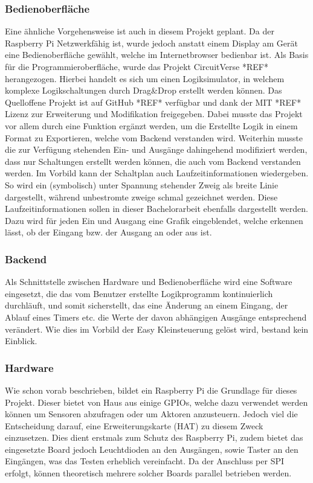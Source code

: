\subsubsection{Bedienoberfläche} \label{kap:grundl:bedienoberfl}
Eine ähnliche Vorgehensweise ist auch in diesem Projekt geplant. Da der Raspberry Pi Netzwerkfähig ist, wurde jedoch anstatt einem Display am Gerät eine Bedienoberfläche gewählt, welche im Internetbrowser bedienbar ist. Als Basis für die Programmieroberfläche, wurde das Projekt CircuitVerse *REF* herangezogen. Hierbei handelt es sich um einen Logiksimulator, in welchem komplexe Logikschaltungen durch Drag\&Drop erstellt werden können. Das Quelloffene Projekt ist auf GitHub *REF* verfügbar und dank  der MIT *REF* Lizenz zur Erweiterung und Modifikation freigegeben. Dabei musste das Projekt vor allem durch eine Funktion ergänzt werden, um die Erstellte Logik in einem Format zu Exportieren, welche vom Backend verstanden wird. Weiterhin musste die zur Verfügung stehenden Ein- und Ausgänge dahingehend modifiziert werden, dass nur Schaltungen erstellt werden können, die auch vom Backend verstanden werden. 
Im Vorbild kann der Schaltplan auch Laufzeitinformationen wiedergeben. So wird ein (symbolisch) unter Spannung stehender Zweig als breite Linie dargestellt, während unbestromte zweige schmal gezeichnet werden. Diese Laufzeitinformationen sollen in dieser Bachelorarbeit ebenfalls dargestellt werden. Dazu wird für jeden Ein und Ausgang eine Grafik eingeblendet, welche erkennen lässt, ob der Eingang bzw. der Ausgang an oder aus ist.
\subsubsection{Backend} 
Als Schnittstelle zwischen Hardware und Bedienoberfläche wird eine Software eingesetzt, die das vom Benutzer erstellte Logikprogramm kontinuierlich durchläuft, und somit sicherstellt, das eine Änderung an einem Eingang, der Ablauf eines Timers etc. die Werte der davon abhängigen Ausgänge entsprechend verändert. Wie dies im Vorbild der Easy Kleinsteuerung gelöst wird, bestand kein Einblick.  

\subsubsection{Hardware} 
Wie schon vorab beschrieben, bildet ein Raspberry Pi die Grundlage für dieses Projekt. Dieser bietet von Haus aus einige GPIOs, welche  dazu  verwendet werden können um Sensoren abzufragen oder um Aktoren anzusteuern. Jedoch viel die Entscheidung darauf, eine Erweiterungskarte (HAT) zu diesem Zweck einzusetzen. Dies dient erstmals zum Schutz des Raspberry Pi, zudem bietet das eingesetzte Board jedoch Leuchtdioden an den Ausgängen, sowie Taster an den Eingängen, was das Testen erheblich vereinfacht. Da der Anschluss per SPI erfolgt, können theoretisch mehrere solcher Boards parallel betrieben werden. 

